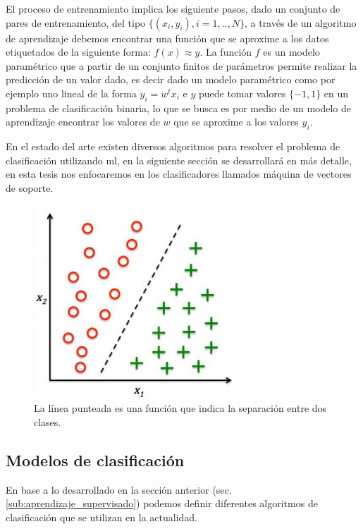 El proceso de entrenamiento implica los siguiente pasos, dado un conjunto de pares de entrenamiento, del tipo $\{(x_i, y_i), i=1,..,N\}$, a través de un algoritmo de aprendizaje debemos encontrar una función que se aproxime a los datos etiquetados de la siguiente forma: $f(x) ≈ y$. La función $f$ es un modelo paramétrico que a partir de un conjunto finitos de parámetros permite realizar la predicción de un valor dado, es decir dado un modelo paramétrico como por ejemplo uno lineal de la forma $y_i = w^t x_i$ e $y$ puede tomar valores $\{-1,1\}$ en un problema de clasificación binaria, lo que se busca es por medio de un modelo de aprendizaje encontrar los valores de  $w$ que se aproxime a los valores $y_i$.

En el estado del arte existen diversos algoritmos para resolver el problema de clasificación utilizando \ac{ml}, en la siguiente sección se desarrollará en más detalle, en esta tesis nos enfocaremos en los clasificadores llamados máquina de vectores de soporte. 

\begin{figure}[H] \centering
  \includegraphics[scale=0.4,keepaspectratio=true,clip=true]{imagenes/MarcoTeorico/classification.jpg}
  \caption{La línea punteada es una función que indica la separación entre dos clases.}\label{Fig:clasificacion}
\end{figure}




\subsection{Modelos de clasificación}\label{sub:clasificadores}

En base a lo desarrollado en la sección anterior (sec.\ref{sub:aprendizaje_supervisado}) podemos definir diferentes algoritmos de clasificación que se utilizan en la actualidad.


